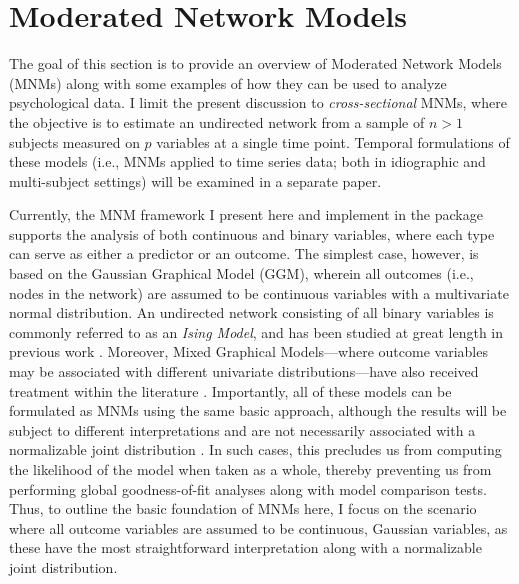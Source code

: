 \chapter{Moderated Network Models}
The goal of this section is to provide an overview of Moderated Network Models (MNMs) along with some examples of how they can be used to analyze psychological data.
I limit the present discussion to \textit{cross-sectional} MNMs, where the objective is to estimate an undirected network from a sample of $n > 1$ subjects measured on $p$ variables at a single time point. Temporal formulations of these models (i.e., MNMs applied to time series data; both in idiographic and multi-subject settings) will be examined in a separate paper. 

Currently, the MNM framework I present here and implement in the  package supports the analysis of both continuous and binary variables, where each type can serve as either a predictor or an outcome. The simplest case, however, is based on the Gaussian Graphical Model (GGM), wherein all outcomes (i.e., nodes in the network) are assumed to be continuous variables with a multivariate normal distribution. An undirected network consisting of all binary variables is commonly referred to as an \textit{Ising Model}, and has been studied at great length in previous work \cite{lauritzen1996graphical,van2014new,marsman2018introduction}. Moreover, Mixed Graphical Models---where outcome variables may be associated with different univariate distributions---have also received treatment within the literature \cite{yang2014mixed,chen2014selection}. Importantly, all of these models can be formulated as MNMs using the same basic approach, although the results will be subject to different interpretations and are not necessarily associated with a normalizable joint distribution \cite{yang2014mixed, haslbeck2018moderated}. In such cases, this precludes us from computing the likelihood of the model when taken as a whole, thereby preventing us from performing global goodness-of-fit analyses along with model comparison tests. Thus, to outline the basic foundation of MNMs here, I focus on the scenario where all outcome variables are assumed to be continuous, Gaussian variables, as these have the most straightforward interpretation along with a normalizable joint distribution. 

